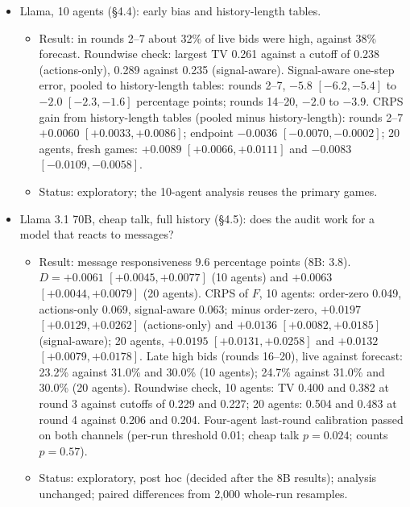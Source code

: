 \documentclass[11pt,letterpaper]{article}
\begin{document}
\begin{itemize}
\begin{itemize}
      Signal-aware: 0.094 and 0.071 against 0.196.
      Endpoint-distribution test of the actions-only audit on the original games: $p = 0.00005$; paired score difference $+0.0252$ $[-0.0034, +0.0596]$.
      Compounding: from the same 15\% all-high start, per-agent retention of 0.905 versus an effective 0.999 gives survival over 76 agent-rounds of 0.05\% versus 95\% (ratio about 1,900).
    \item Status: exploratory; forecasts are cached-kernel calculations; the fresh cohort is a retrospective reapplication of the original check.
  \end{itemize}
  \item Llama, 10 agents (§4.4): early bias and history-length tables.
  \begin{itemize}
    \item Result: in rounds 2--7 about 32\% of live bids were high, against 38\% forecast.
      Roundwise check: largest TV 0.261 against a cutoff of 0.238 (actions-only), 0.289 against 0.235 (signal-aware).
      Signal-aware one-step error, pooled to history-length tables: rounds 2--7, $-5.8$ $[-6.2, -5.4]$ to $-2.0$ $[-2.3, -1.6]$ percentage points; rounds 14--20, $-2.0$ to $-3.9$.
      CRPS gain from history-length tables (pooled minus history-length): rounds 2--7 $+0.0060$ $[+0.0033, +0.0086]$; endpoint $-0.0036$ $[-0.0070, -0.0002]$; 20 agents, fresh games: $+0.0089$ $[+0.0066, +0.0111]$ and $-0.0083$ $[-0.0109, -0.0058]$.
    \item Status: exploratory; the 10-agent analysis reuses the primary games.
  \end{itemize}
  \item Llama 3.1 70B, cheap talk, full history (§4.5): does the audit work for a model that reacts to messages?
  \begin{itemize}
    \item Result: message responsiveness 9.6 percentage points (8B: 3.8).
      $D = +0.0061$ $[+0.0045, +0.0077]$ (10 agents) and $+0.0063$ $[+0.0044, +0.0079]$ (20 agents).
      CRPS of $F$, 10 agents: order-zero 0.049, actions-only 0.069, signal-aware 0.063; minus order-zero, $+0.0197$ $[+0.0129, +0.0262]$ (actions-only) and $+0.0136$ $[+0.0082, +0.0185]$ (signal-aware); 20 agents, $+0.0195$ $[+0.0131, +0.0258]$ and $+0.0132$ $[+0.0079, +0.0178]$.
      Late high bids (rounds 16--20), live against forecast: 23.2\% against 31.0\% and 30.0\% (10 agents); 24.7\% against 31.0\% and 30.0\% (20 agents).
      Roundwise check, 10 agents: TV 0.400 and 0.382 at round 3 against cutoffs of 0.229 and 0.227; 20 agents: 0.504 and 0.483 at round 4 against 0.206 and 0.204.
      Four-agent last-round calibration passed on both channels (per-run threshold 0.01; cheap talk $p = 0.024$; counts $p = 0.57$).
    \item Status: exploratory, post hoc (decided after the 8B results); analysis unchanged; paired differences from 2,000 whole-run resamples.
  \end{itemize}
\end{itemize}
\end{document}
